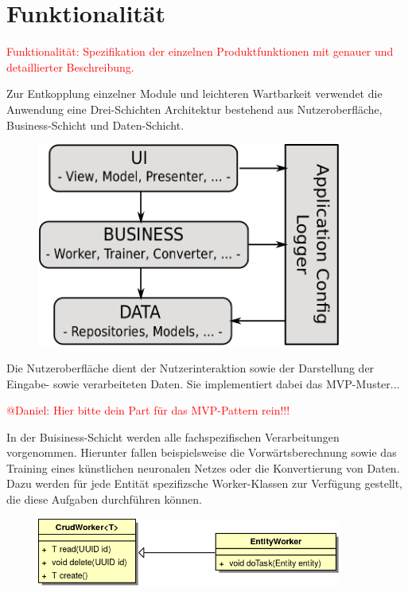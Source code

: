\chapter{Funktionalität}
\textcolor{red}{Funktionalität: Spezifikation der einzelnen Produktfunktionen mit genauer und detaillierter Beschreibung.}

Zur Entkopplung einzelner Module und leichteren Wartbarkeit verwendet die Anwendung eine Drei-Schichten Architektur bestehend aus Nutzeroberfläche, Business-Schicht und Daten-Schicht. 
\begin{figure}[h]
\begin{center}
\includegraphics[width=10cm]{Abbildungen/UML/jan/SchichtenModell.png}
\end{center}
\end{figure}
Die Nutzeroberfläche dient der Nutzerinteraktion sowie der Darstellung der Eingabe- sowie verarbeiteten Daten. Sie implementiert dabei das MVP-Muster...

\textcolor{red}{ @Daniel: Hier bitte dein Part für das MVP-Pattern rein!!!}


In der Buisiness-Schicht werden alle fachspezifischen Verarbeitungen vorgenommen. Hierunter fallen beispielsweise die Vorwärtsberechnung sowie das Training eines künstlichen neuronalen Netzes oder die Konvertierung von Daten. Dazu werden für jede Entität spezifizsche Worker-Klassen zur Verfügung gestellt, die diese Aufgaben durchführen können.

\begin{figure}[h]
\begin{center}
\includegraphics[width=10cm]{Abbildungen/UML/jan/workerClassDiagramm.png}
\end{center}
\end{figure}


